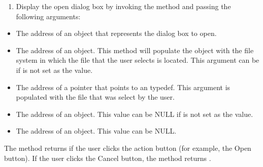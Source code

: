 \documentclass[letterpaper,12pt,english,openany,oneside]{sphinxmanual}
\begin{document}
\begin{sphinxVerbatim}[commandchars=\\\{\}]
  
   
  
\end{sphinxVerbatim}
\begin{enumerate}
%
\setcounter{enumi}{9}
\item {} 
Display the open dialog box by invoking the  method and passing the following arguments:

\end{enumerate}
\begin{itemize}
\item {} 
The address of an  object that represents the dialog box to open.

\item {} 
The address of an  object. This method will populate the  object with the file system in which the file that the user selects is located. This argument can be  if  is not set as the  value.

\item {} 
The address of a pointer that points to an  typedef. This argument is populated with the file that was select by the user.

\item {} 
The address of an  object. This value can be NULL if  is not set as the  value.

\item {} 
The address of an  object. This value can be NULL.

\end{itemize}

The  method returns  if the user clicks the action button (for example, the Open button). If the user clicks the Cancel button, the method returns .
\end{document}
